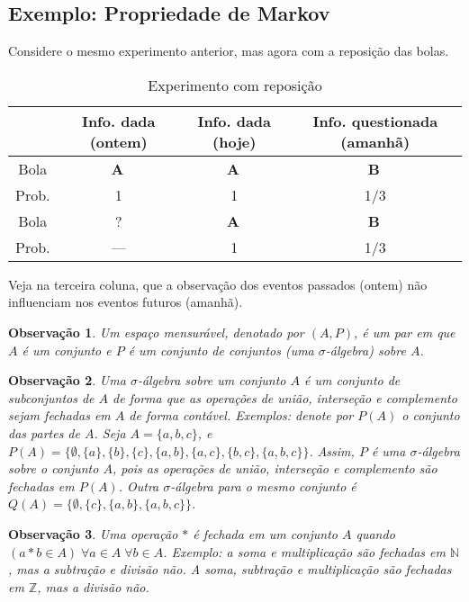\documentclass[12pt,a4paper]{article}
\newtheorem{obs}{Observação}
\def\A{$\mathbf{A}$\,}
\def\B{$\mathbf{B}$\,}
\def\NN{\mathbb{N}}
\begin{document}
\subsection{Exemplo: Propriedade de Markov}
Considere o mesmo experimento anterior, mas agora com a reposição das bolas.

\begin{table}[H]\centering
\caption{Experimento com reposição}
\begin{tabular}{|c|c|c|||c|}
\hline
&Info. dada (ontem) & Info. dada (hoje) & Info. questionada (amanhã)\\\hline
Bola & \A & \A & \B\\
Prob. & 1 & 1 & 1/3\\
\hline\hline
Bola & ? & \A & \B\\
Prob. & --- & 1 & 1/3\\
\hline
\end{tabular}
\end{table}

Veja na terceira coluna, que a observação dos eventos passados (ontem) não influenciam nos eventos futuros (amanhã).


\begin{obs} Um espaço mensurável, denotado por $(A,P)$, é um par em que $A$ é um conjunto e $P$ é um conjunto de conjuntos (uma $\sigma$-álgebra) sobre $A$.
\end{obs}
\begin{obs} Uma $\sigma$-álgebra sobre um conjunto $A$ é um conjunto de subconjuntos de $A$ de forma que as operações de \emph{união}, \emph{interseção} e \emph{complemento} sejam fechadas em $A$ de forma contável. Exemplos: denote por $P(A)$ o \emph{conjunto das partes de $A$}. Seja $A=\{a,b,c\}$, e $P(A)=\Big\{\emptyset,\{a\},\{b\},\{c\},\{a,b\},\{a,c\},\{b,c\},\{a,b,c\}\Big\}$. Assim, $P$ é uma $\sigma$-álgebra sobre o conjunto $A$, pois as operações de \emph{união}, \emph{interseção} e \emph{complemento} são fechadas em $P(A)$.   Outra $\sigma$-álgebra para o mesmo conjunto é $Q(A)=\Big\{\emptyset,\{c\},\{a,b\},\{a,b,c\}\Big\}$.
\end{obs}
\begin{obs} Uma operação $*$ é fechada em um conjunto $A$ quando $(a*b\in A)\; \forall a\in A\;\forall b\in A$. Exemplo: a soma e multiplicação são fechadas em $\NN$, mas a subtração e divisão não. A soma, subtração e multiplicação são fechadas em $\mathbb{Z}$, mas a divisão não.
\end{obs}
\end{document}
